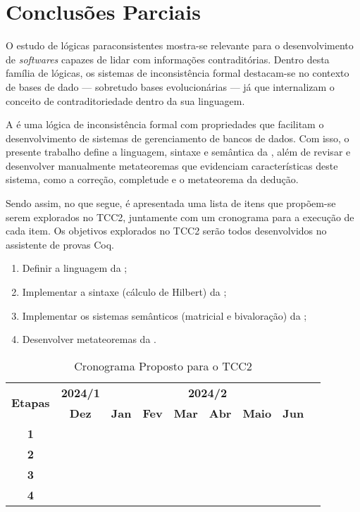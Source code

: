 \chapter{Conclusões Parciais}\label{chap:conclusao}

O estudo de lógicas paraconsistentes mostra-se relevante para o desenvolvimento de \textit{softwares} capazes de lidar com informações contraditórias. Dentro desta família de lógicas, os sistemas de inconsistência formal destacam-se no contexto de bases de dado {---} sobretudo bases evolucionárias {---} já que internalizam o conceito de contraditoriedade dentro da sua linguagem.

A \lfium{} é uma lógica de inconsistência formal com propriedades que facilitam o desenvolvimento de sistemas de gerenciamento de bancos de dados. Com isso, o presente trabalho define a linguagem, sintaxe e semântica da \lfium{}, além de revisar e desenvolver manualmente metateoremas que evidenciam características deste sistema, como a correção, completude e o metateorema da dedução.

Sendo assim, no que segue, é apresentada uma lista de itens que propõem-se serem explorados no TCC2, juntamente com um cronograma para a execução de cada item. Os objetivos explorados no TCC2 serão todos desenvolvidos no assistente de provas Coq.

\begin{enumerate}
    \item Definir a linguagem da \lfium{};
    \item Implementar a sintaxe (cálculo de Hilbert) da \lfium{};
    \item Implementar os sistemas semânticos (matricial e bivaloração) da \lfium{};
    \item Desenvolver metateoremas da \lfium{}.
\end{enumerate}

  \begin{table}[htbp]
    \centering
    \begin{tabular}{|c|c|c|c|c|c|c|c|c|}
      \hline
      \multirow{2}{*}{\textbf{\small{Etapas}}} & \textbf{\small{2024/1}} & \multicolumn{6}{c|}{\textbf{\small{2024/2}}} \\
      \cline{2-8}
      & \textbf{Dez} & \textbf{Jan} & \textbf{Fev} & \textbf{Mar} & \textbf{Abr} & \textbf{Maio} & \textbf{Jun} \\
      \hline
      \textbf{\small{1}}  & \cellcolor{gray} & \cellcolor{gray} &  &  &  &  & \\
      \hline
      \textbf{\small{2}}  &  & \cellcolor{gray} & \cellcolor{gray} &  &  &  & \\
      \hline
      \textbf{\small{3}}  &  & \cellcolor{gray} & \cellcolor{gray} & \cellcolor{gray} &  &  & \\
      \hline
      \textbf{\small{4}}  &  &  & \cellcolor{gray} & \cellcolor{gray} & \cellcolor{gray} & \cellcolor{gray} & \cellcolor{gray}\\
      \hline
    \end{tabular}
    \caption{Cronograma Proposto para o TCC2}
  \end{table}
